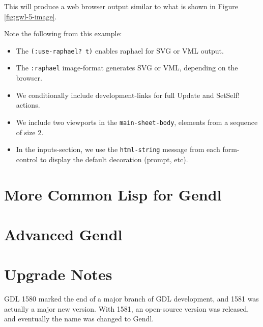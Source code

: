 \documentclass [11pt]{book}
\begin{document}
This will produce a web browser output similar to what is shown in Figure 
\ref{fig:gwl-5-image}.



Note the following from this example:

\begin{itemize}

\item The \texttt{(:use-raphael? t)} enables raphael for SVG or VML output.

\item The \texttt{:raphael} image-format generates SVG or VML, depending on the browser.

\item We conditionally include development-links for full Update and SetSelf! actions.

\item We include two viewports in the \texttt{main-sheet-body}, elements from a sequence of size 2.

\item In the inputs-section, we use
                  the \texttt{html-string} message from each
                  form-control to display the default
                  decoration (prompt, etc).

\end{itemize}





\chapter{More Common Lisp for Gendl}

\label{chap:morecommonlispforgendl}



\chapter{Advanced Gendl}

\label{chap:advancedgendl}



\chapter*{Upgrade Notes}

\label{chap:upgradenotes}

GDL 1580 marked the end of a major branch of GDL development,
and 1581 was actually a major new version. With 1581, an open-source
version was released, and eventually the name was changed to
Gendl. 
\end{document}
